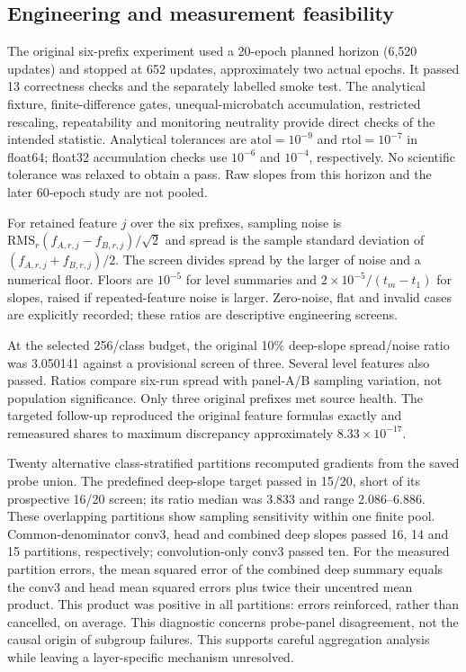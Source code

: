 \subsection{Engineering and measurement feasibility}
The original six-prefix experiment used a 20-epoch planned horizon (6,520 updates) and stopped at 652 updates, approximately two actual epochs. It passed 13 correctness checks and the separately labelled smoke test. The analytical fixture, finite-difference gates, unequal-microbatch accumulation, restricted rescaling, repeatability and monitoring neutrality provide direct checks of the intended statistic. Analytical tolerances are $\mathrm{atol}=10^{-9}$ and $\mathrm{rtol}=10^{-7}$ in float64; float32 accumulation checks use $10^{-6}$ and $10^{-4}$, respectively. No scientific tolerance was relaxed to obtain a pass. Raw slopes from this horizon and the later 60-epoch study are not pooled.

For retained feature $j$ over the six prefixes, sampling noise is $\mathrm{RMS}_r(f_{A,r,j}-f_{B,r,j})/\sqrt{2}$ and spread is the sample standard deviation of $(f_{A,r,j}+f_{B,r,j})/2$. The screen divides spread by the larger of noise and a numerical floor. Floors are $10^{-5}$ for level summaries and $2\times10^{-5}/(t_m-t_1)$ for slopes, raised if repeated-feature noise is larger. Zero-noise, flat and invalid cases are explicitly recorded; these ratios are descriptive engineering screens.

At the selected 256/class budget, the original 10\% deep-slope spread/noise ratio was 3.050141 against a provisional screen of three. Several level features also passed. Ratios compare six-run spread with panel-A/B sampling variation, not population significance. Only three original prefixes met source health. The targeted follow-up reproduced the original feature formulas exactly and remeasured shares to maximum discrepancy approximately $8.33\times10^{-17}$.

Twenty alternative class-stratified partitions recomputed gradients from the saved probe union. The predefined deep-slope target passed in 15/20, short of its prospective 16/20 screen; its ratio median was 3.833 and range 2.086--6.886. These overlapping partitions show sampling sensitivity within one finite pool. Common-denominator conv3, head and combined deep slopes passed 16, 14 and 15 partitions, respectively; convolution-only conv3 passed ten. For the measured partition errors, the mean squared error of the combined deep summary equals the conv3 and head mean squared errors plus twice their uncentred mean product. This product was positive in all partitions: errors reinforced, rather than cancelled, on average. This diagnostic concerns probe-panel disagreement, not the causal origin of subgroup failures. This supports careful aggregation analysis while leaving a layer-specific mechanism unresolved.

